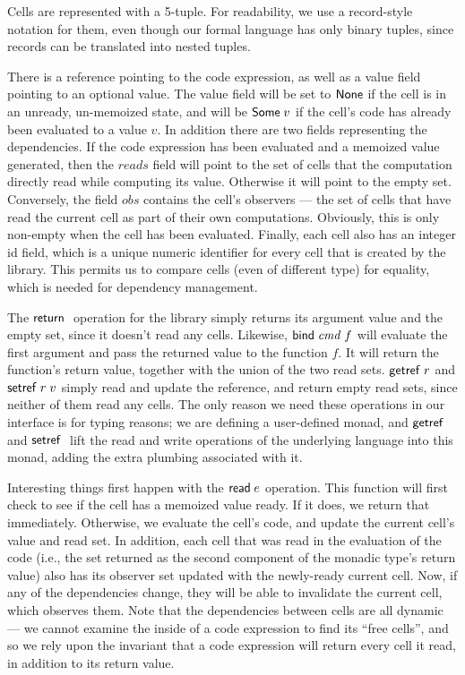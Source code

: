 Cells are represented with a 5-tuple. For readability, we use a
record-style notation for them, even though our formal language has
only binary tuples, since records can be translated into nested
tuples.

There is a reference pointing to the code expression, as well as a
value field pointing to an optional value. The value field will be set
to $\mathsf{None}$ if the cell is in an unready, un-memoized state, and
will be $\mathsf{Some}\;v$ if the cell's code has already been
evaluated to a value $v$. In addition there are two fields
representing the dependencies. If the code expression has been
evaluated and a memoized value generated, then the $reads$ field will
point to the set of cells that the computation directly read while
computing its value. Otherwise it will point to the empty
set. Conversely, the field $obs$ contains the cell's observers --- the
set of cells that have read the current cell as part of their own
computations. Obviously, this is only non-empty when the cell has been
evaluated. Finally, each cell also has an integer id field, which is a
unique numeric identifier for every cell that is created by the
library. This permits us to compare cells (even of different type) for
equality, which is needed for dependency management.

The $\mathsf{return}\;$ operation for the library simply returns its argument
value and the empty set, since it doesn't read any cells. Likewise,
$\mathsf{bind}\; \mathit{cmd}\;f$ will evaluate the first argument and pass the returned
value to the function $f$. It will return the function's return value,
together with the union of the two read sets. $\mathsf{getref}\; r$ and $\mathsf{setref}\;
r\;v$ simply read and update the reference, and return empty read
sets, since neither of them read any cells. The only reason we need 
these operations in our interface is for typing reasons; we are defining
a user-defined monad, and $\mathsf{getref}\;$ and $\mathsf{setref}\;$ lift the read and
write operations of the underlying language into this monad, adding 
the extra plumbing associated with it.

Interesting things first happen with the $\mathsf{read}\; e$ operation. This
function will first check to see if the cell has a memoized value
ready. If it does, we return that immediately. Otherwise, we evaluate
the cell's code, and update the current cell's value and read set. In
addition, each cell that was read in the evaluation of the code (i.e.,
the set returned as the second component of the monadic type's return
value) also has its observer set updated with the newly-ready current
cell. Now, if any of the dependencies change, they will be able to
invalidate the current cell, which observes them. Note that the
dependencies between cells are all dynamic --- we cannot examine the
inside of a code expression to find its ``free cells'', and so we rely
upon the invariant that a code expression will return every cell it
read, in addition to its return value.

